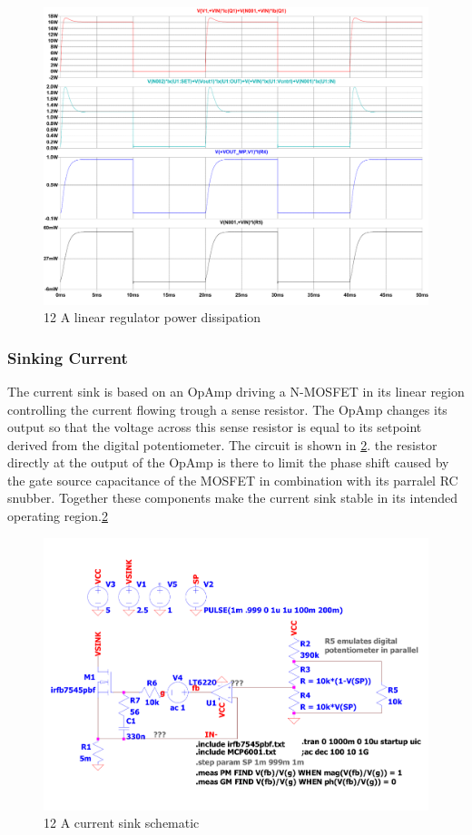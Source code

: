\begin{figure}[h!]
    \centering
    \includegraphics[scale=0.25]{LT3080-1_PowerDissipation.pdf}
    \caption{12 A linear regulator power dissipation}
    \label{fig:LT3080-1_PowerDissipation}
\end{figure}

\subsubsection{Sinking Current}
The current sink is based on an OpAmp driving a N-MOSFET in its linear region controlling the current flowing trough a sense resistor. The OpAmp changes its output so that the voltage across this sense resistor is equal to its setpoint derived from the digital potentiometer. The circuit is shown in \ref{fig:CurrentSinkSchematic}. the resistor directly at the output of the OpAmp is there to limit the phase shift caused by the gate source capacitance of the MOSFET in combination with its parralel RC snubber. Together these components make the current sink stable in its intended operating region.\ref{fig:CurrentSinkSchematic}

\begin{figure}[h!]
    \centering
    \includegraphics[scale=0.25]{CurrentSinkSchematic.pdf}
    \caption{12 A current sink schematic}
    \label{fig:CurrentSinkSchematic}
\end{figure}

